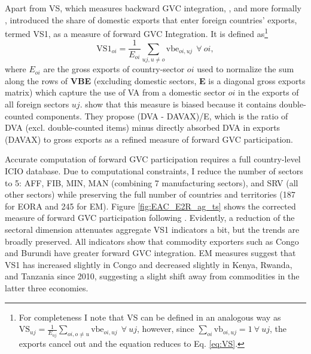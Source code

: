 \documentclass[a4paper]{article}
\begin{document}
Apart from VS, which measures backward GVC integration, \citet{hummels2001nature}, and more formally \citet{daudin2011produces}, introduced the share of domestic exports that enter foreign countries' exports, termed VS1, as a measure of forward GVC Integration. It is defined as\footnote{For completeness I note that VS can be defined in an analogous way as $\text{VS}_{uj} = \frac{1}{E_{uj}} \sum_{oi, o \neq  u} \text{vbe}_{oi, uj}\ \ \forall\ uj$, however, since $\sum_{oi} \text{vb}_{oi, uj} = 1\ \forall\ uj$, the exports cancel out and the equation reduces to Eq. \ref{eq:VS}. \vspace{-4mm}}
%
\begin{equation} \label{eq:VS1}
\text{VS1}_{oi} = \frac{1}{E_{oi}} \sum_{uj, u \neq  o} \text{vbe}_{oi, uj}\ \ \forall\ oi,
\end{equation}
%
\noindent where $E_{oi}$ are the gross exports of country-sector $oi$ used to normalize the sum along the rows of \textbf{VBE} (excluding domestic sectors, \textbf{E} is a diagonal gross exports matrix) which capture the use of VA from a domestic sector $oi$ in the exports of all foreign sectors $uj$. \citet{borin2019measuring} show that this measure is biased because it contains double-counted components. They propose (DVA - DAVAX)/E, which is the ratio of DVA (excl. double-counted items) minus directly absorbed DVA in exports (DAVAX) to gross exports as a refined measure of forward GVC participation. \newline 

Accurate computation of forward GVC participation requires a full country-level ICIO database. Due to computational constraints, I reduce the number of sectors to 5: AFF, FIB, MIN, MAN (combining 7 manufacturing sectors), and SRV (all other sectors) while preserving the full number of countries and territories (187 for EORA and 245 for EM). Figure \ref{fig:EAC_E2R_ag_ts} shows the corrected measure of forward GVC participation following \citet{borin2019measuring}. Evidently, a reduction of the sectoral dimension attenuates aggregate VS1 indicators a bit, but the trends are broadly preserved. All indicators show that commodity exporters such as Congo and Burundi have greater forward GVC integration. EM measures suggest that VS1 has increased slightly in Congo and decreased slightly in Kenya, Rwanda, and Tanzania since 2010, suggesting a slight shift away from commodities in the latter three economies. 
\end{document}
